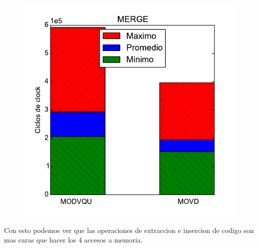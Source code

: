 \begin{figure}[h!]
	\centering
	\includegraphics[scale=0.45]{images/merge_extractmov}
\end{figure}

Con esto podemos ver que las operaciones de extraccion e insercion de codigo son mas caras que hacer los 4 accesos a memoria.





